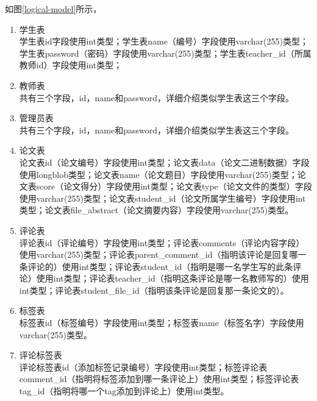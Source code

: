 如图\ref{logical-model}所示，
\begin{enumerate}
    \item 学生表\\
    学生表id字段使用int类型；学生表name（编号）字段使用varchar(255)类型；学生表password（密码）字段使用varchar(255)类型；学生表teacher\_id（所属教师id）字段使用int类型；
    \item 教师表\\
    共有三个字段，id，name和password，详细介绍类似学生表这三个字段。
    \item 管理员表\\
    共有三个字段，id，name和password，详细介绍类似学生表这三个字段。
    \item 论文表\\
    论文表id（论文编号）字段使用int类型；论文表data（论文二进制数据）字段使用longblob类型；论文表name（论文题目）字段使用varchar(255)类型；论文表score（论文得分）字段使用int类型；论文表type（论文文件的类型）字段使用varchar(255)类型；论文表student\_id（论文所属学生编号）字段使用int类型；论文表file\_abstract（论文摘要内容）字段使用varchar(255)类型。
    \item 评论表\\
    评论表id（评论编号）字段使用int类型；评论表comments（评论内容字段）使用varchar(255)类型；评论表parent\_comment\_id（指明该评论是回复哪一条评论的）使用int类型；评论表student\_id（指明是哪一名学生写的此条评论）使用int类型；评论表teacher\_id（指明这条评论是哪一名教师写的）使用int类型；评论表student\_file\_id（指明该条评论是回复那一条论文的）。
    \item 标签表\\
    标签表id（标签编号）字段使用int类型；标签表name（标签名字）字段使用varchar(255)类型。
    \item 评论标签表\\
    评论标签表id（添加标签记录编号）字段使用int类型；标签评论表comment\_id（指明将标签添加到哪一条评论上）使用int类型；标签评论表tag\_id（指明将哪一个tag添加到评论上）使用int类型。
\end{enumerate}

